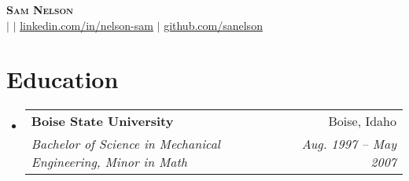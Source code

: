 \documentclass[letterpaper,10pt]{article}
\makeatletter
\newcommand{\resumeSubheading}[4]{
  \vspace{-2pt}\item
    \begin{tabular*}{0.97\textwidth}[t]{l@{\extracolsep{\fill}}r}
      \textbf{#1} & #2 \\
      \textit{\small#3} & \textit{\small #4} \\
    \end{tabular*}\vspace{-7pt}
}
\newcommand{\resumeSubHeadingListStart}{\begin{itemize}[leftmargin=0.15in, label={}]}
\newcommand{\resumeSubHeadingListEnd}{\end{itemize}}
\makeatother
\begin{document}

\begin{center}
    \textbf{\Huge \scshape Sam Nelson} \\ \vspace{1pt}
    \small \MYPHONE \vspace{1pt} $|$ \href{mailto:\MYEMAIL}{\uline{\MYEMAIL}} $|$ 
    \href{https://linkedin.com/in/nelson-sam}{\uline{linkedin.com/in/nelson-sam}} $|$
    \href{https://github.com/sanelson}{\uline{github.com/sanelson}}
\end{center}


\section{Education}
  \resumeSubHeadingListStart
    \resumeSubheading
      {Boise State University}{Boise, Idaho}
      {Bachelor of Science in Mechanical Engineering, Minor in Math}{Aug. 1997 -- May 2007}
  \resumeSubHeadingListEnd



%

\end{document}
